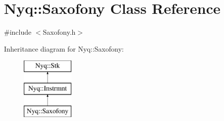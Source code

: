 \hypertarget{class_nyq_1_1_saxofony}{}\section{Nyq\+:\+:Saxofony Class Reference}
\label{class_nyq_1_1_saxofony}


{\ttfamily \#include $<$Saxofony.\+h$>$}

Inheritance diagram for Nyq\+:\+:Saxofony\+:\begin{figure}[H]
\begin{center}
\leavevmode
\includegraphics[height=3.000000cm]{class_nyq_1_1_saxofony}
\end{center}
\end{figure}
